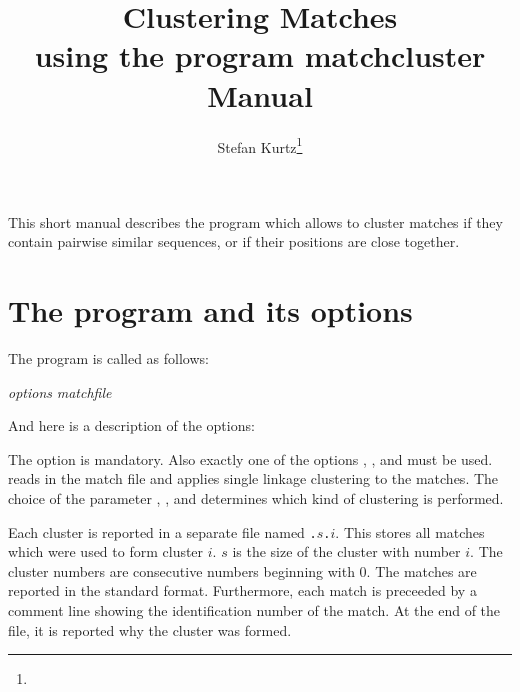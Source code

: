 \documentclass[12pt]{article}
\author{Stefan Kurtz\thanks{\SKaffiliation}}
\title{\textbf{Clustering Matches}\\
       \textbf{using the program matchcluster}\\[2mm]
       \textbf{Manual}}
\begin{document}
\maketitle
This short manual describes the program \MCL which allows to 
cluster matches if they contain pairwise similar sequences,
or if their positions are close together.

\section{The program \MCL and its options}

The program is called as follows:
\par
\noindent\MCL \emph{options} \emph{matchfile}
\par
And here is a description of the options:
\par
\begin{list}{}{}






\end{list}

The option  is mandatory.
Also exactly one of the options
, , and 
must be used. \MCL reads in the match file and applies single linkage 
clustering to the matches. The choice of the parameter
, , and 
determines which kind of clustering is performed.

Each cluster is reported in a separate file named
\texttt{.}$s$\texttt{.}$i$.
This stores all matches which were used to form cluster \(i\).
\(s\) is the size of the cluster with number \(i\). 
The cluster numbers are consecutive numbers beginning with 0.
The matches are reported in the standard \VM format.
Furthermore, each match is preceeded by a comment line showing the 
identification number of the match. At the end of the file, it is 
reported why the cluster was formed.
\end{document}
